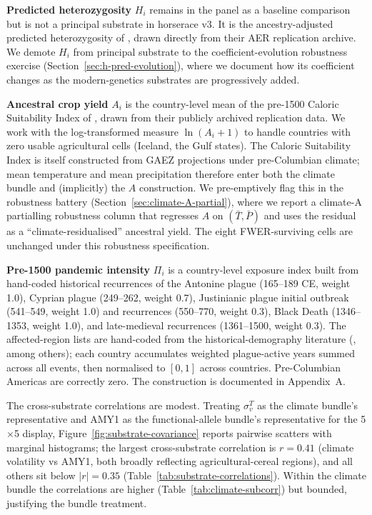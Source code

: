 \documentclass[11pt,letterpaper]{article}
\begin{document}
\textbf{Predicted heterozygosity} $H_i$ remains in the panel as a baseline comparison but is not a principal substrate in horserace v3. It is the ancestry-adjusted predicted heterozygosity of \citet{ashraf2013out}, drawn directly from their AER replication archive. We demote $H_i$ from principal substrate to the coefficient-evolution robustness exercise (Section~\ref{sec:h-pred-evolution}), where we document how its coefficient changes as the modern-genetics substrates are progressively added.

\textbf{Ancestral crop yield} $A_i$ is the country-level mean of the pre-1500 Caloric Suitability Index of \citet{galor2016agricultural}, drawn from their publicly archived replication data. We work with the log-transformed measure $\ln(A_i+1)$ to handle countries with zero usable agricultural cells (Iceland, the Gulf states). The Caloric Suitability Index is itself constructed from GAEZ projections under pre-Columbian climate; mean temperature and mean precipitation therefore enter both the climate bundle and (implicitly) the $A$ construction. We pre-emptively flag this in the robustness battery (Section~\ref{sec:climate-A-partial}), where we report a climate-A partialling robustness column that regresses $A$ on $(\bar T, \bar P)$ and uses the residual as a ``climate-residualised'' ancestral yield. The eight FWER-surviving cells are unchanged under this robustness specification.

\textbf{Pre-1500 pandemic intensity} $\Pi_i$ is a country-level exposure index built from hand-coded historical recurrences of the Antonine plague (165--189 CE, weight 1.0), Cyprian plague (249--262, weight 0.7), Justinianic plague initial outbreak (541--549, weight 1.0) and recurrences (550--770, weight 0.3), Black Death (1346--1353, weight 1.0), and late-medieval recurrences (1361--1500, weight 0.3). The affected-region lists are hand-coded from the historical-demography literature (\citealp{benedictow2004}, among others); each country accumulates weighted plague-active years summed across all events, then normalised to $[0,1]$ across countries. Pre-Columbian Americas are correctly zero. The construction is documented in Appendix~A.

The cross-substrate correlations are modest. Treating $\sigma_v^T$ as the climate bundle's representative and AMY1 as the functional-allele bundle's representative for the 5$\times$5 display, Figure~\ref{fig:substrate-covariance} reports pairwise scatters with marginal histograms; the largest cross-substrate correlation is $r=0.41$ (climate volatility vs AMY1, both broadly reflecting agricultural-cereal regions), and all others sit below $|r|=0.35$ (Table~\ref{tab:substrate-correlations}). Within the climate bundle the correlations are higher (Table~\ref{tab:climate-subcorr}) but bounded, justifying the bundle treatment.
\end{document}
